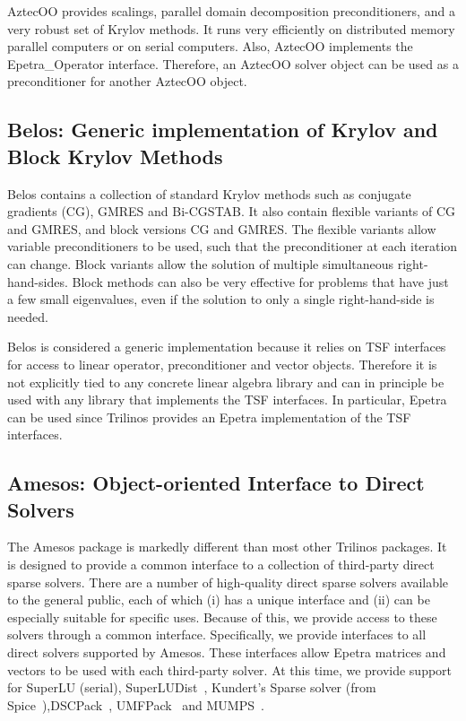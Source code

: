 \documentclass[acmtoms,acmnow]{acmtrans2m}
\begin{document}
AztecOO provides scalings, parallel domain decomposition 
preconditioners, and a very robust set of Krylov methods.  It runs 
very efficiently on distributed memory parallel computers or on 
serial computers.  Also, AztecOO implements the Epetra\_Operator 
interface.  Therefore, an AztecOO solver object can be used as a 
preconditioner for another AztecOO object.

\subsection{Belos: Generic implementation of Krylov and Block Krylov
Methods}

Belos contains a collection of standard Krylov methods such as
conjugate gradients (CG), GMRES and Bi-CGSTAB.  It also contain flexible
variants of CG and GMRES, and block versions CG and GMRES.  The
flexible variants allow variable preconditioners to be used, such that
the preconditioner at each iteration can change.  Block variants allow
the solution of multiple simultaneous right-hand-sides.  Block methods
can also be very effective for problems that have just a few small
eigenvalues, even if the solution to only a single right-hand-side is
needed.

Belos is considered a generic implementation because it relies on TSF
interfaces for access to linear operator, preconditioner and vector
objects.  Therefore it is not explicitly tied to any concrete linear
algebra library and can in principle be used with any library that
implements the TSF interfaces.  In particular, Epetra can be used
since Trilinos provides an Epetra implementation of the TSF
interfaces.

\subsection{Amesos: Object-oriented Interface to Direct Solvers}

The Amesos package is markedly different than most other Trilinos
packages.  It is designed to provide a common interface to a
collection of third-party direct sparse solvers.
There are a number of high-quality direct sparse
solvers available to the general public, each of which (i) has a unique
interface and (ii) can be especially suitable for specific uses.
Because of this, we provide access to these solvers through a common
interface.  Specifically, we provide interfaces to all direct solvers
supported by Amesos.  These interfaces allow Epetra matrices and
vectors to be used with each third-party solver.  At this time, we
provide support for SuperLU (serial), SuperLUDist~\cite{superlu-home-page}, 
Kundert's Sparse solver (from
Spice~\cite{spice-home-page}),DSCPack~\cite{dscpack-home-page}, UMFPack~\cite{umfpack-home-page}
and MUMPS~\cite{mumps-home-page}.
\end{document}
